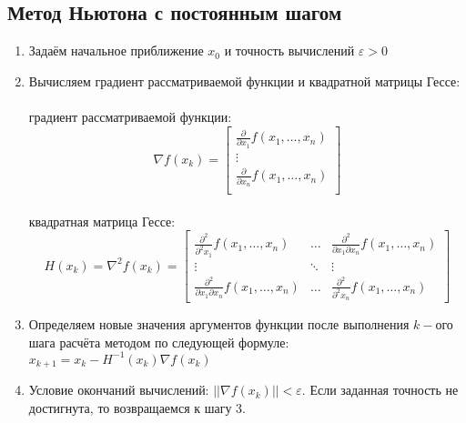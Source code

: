 \documentclass{article}
\begin{document}
\subsection{Метод Ньютона с постоянным шагом}
\begin{enumerate}
    \item Задаём начальное приближение $x_0$ и точность вычислений $\varepsilon>0$
    \item Вычисляем градиент рассматриваемой функции и квадратной матрицы Гессе:\\\\
    градиент рассматриваемой функции:
    \begin{equation*}
        \nabla f(x_k)=
        \begin{bmatrix}
        \frac{\partial}{\partial x_1} f(x_1, \dots ,x_n)\\
        \vdots\\
        \frac{\partial}{\partial x_n} f(x_1, \dots ,x_n)\\
        \end{bmatrix}
    \end{equation*}
    \\
    квадратная матрица Гессе:
    \begin{equation*}
        H(x_k)=\nabla^{2}f(x_k)=
        \begin{bmatrix}
        \frac{\partial^{2}}{\partial^{2} x_1} f(x_1, \dots ,x_n) & \dots &  \frac{\partial^{2}}{\partial x_1 \partial x_n} f(x_1, \dots ,x_n)\\
        \vdots & \ddots &  \vdots\\
        \frac{\partial^{2}}{\partial x_1 \partial x_n} f(x_1, \dots ,x_n) & \dots &
         \frac{\partial^{2}}{\partial^{2} x_n} f(x_1, \dots ,x_n)
        \end{bmatrix}
    \end{equation*}
    \item Определяем новые значения аргументов функции после выполнения $k-$ого шага расчёта методом по следующей формуле: $x_{k+1} =x_k - H^{-1}(x_k) \nabla f(x_k)$
    \item Условие окончаний вычислений: $||\nabla f(x_k)||<\varepsilon$. Если заданная точность не достигнута, то возвращаемся к шагу 3.
\end{enumerate}
\end{document}

